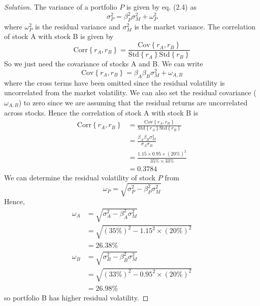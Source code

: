 \begin{proof}[Solution]
 The variance of a portfolio $P$ is given by eq. (2.4) as
 \begin{equation*}
  \sigma_{P}^{2} = \beta_{P}^{2}\sigma_{M}^{2} + \omega_{P}^{2}
 \end{equation*}
 where $\omega_{P}^{2}$ is the residual variance and $\sigma_{M}^{2}$ is the market variance. The correlation of stock A with stock B is given by
 \begin{equation*}
  \mathrm{Corr}\left\{r_{A},r_{B}\right\} = \frac{\mathrm{Cov}\left\{r_{A},r_{B}\right\}}{\mathrm{Std}\left\{r_{A}\right\}\mathrm{Std}\left\{r_{B}\right\}}
 \end{equation*}
 So we just need the covariance of stocks A and B. We can write
 \begin{equation*}
  \mathrm{Cov}\left\{r_{A},r_{B}\right\} = \beta_{A}\beta_{B}\sigma_{M}^{2} + \omega_{A,B}
 \end{equation*}
  where the cross terms have been omitted since the residual volatility is uncorrelated from the market volatility. We can also set the residual covariance ($\omega_{A,B}$) to zero since we are assuming that the residual returns are uncorrelated across stocks. Hence the correlation of stock A with stock B is
  \begin{align*}
   \mathrm{Corr}\left\{r_{A},r_{B}\right\} &= \frac{\mathrm{Cov}\left\{r_{A},r_{B}\right\}}{\mathrm{Std}\left\{r_{A}\right\}\mathrm{Std}\left\{r_{B}\right\}} \\
					   &= \frac{\beta_{A}\beta_{B}\sigma_{M}^{2}}{\sigma_{A}\sigma_{B}} \\
					   &= \frac{1.15\times0.95\times(20\%)^{2}}{35\%\times33\%} \\
					   &= 0.3784
  \end{align*}
  We can determine the residual volatility of stock $P$ from
  \begin{equation*}
   \omega_{P} = \sqrt{\sigma_{P}^{2}-\beta_{P}^{2}\sigma_{M}^{2}}
  \end{equation*}
  Hence, 
  \begin{align*}
   \omega_{A} &= \sqrt{\sigma_{A}^{2}-\beta_{A}^{2}\sigma_{M}^{2}}\\
	      &= \sqrt{(35\%)^{2}-1.15^{2}\times(20\%)^{2}}\\
	      &= 26.38 \%
  \end{align*}
  \begin{align*}
   \omega_{B} &= \sqrt{\sigma_{B}^{2}-\beta_{B}^{2}\sigma_{M}^{2}}\\
	      &= \sqrt{(33\%)^{2}-0.95^{2}\times(20\%)^{2}}\\
	      &= 26.98 \%
  \end{align*}
  so portfolio B has higher residual volatility.

\end{proof}

